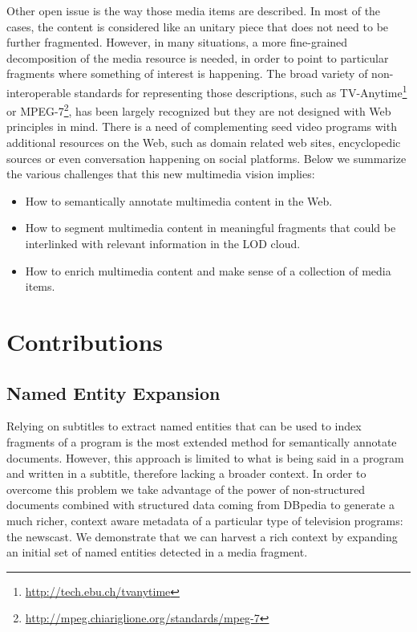\documentclass[a4paper,11pt]{report}
\begin{document}
Other open issue is the way those media items are described. In most of the cases, the content is considered like an unitary piece that does not need to be further fragmented. However, in many situations, a more fine-grained decomposition of the media resource is needed, in order to point to particular fragments where something of interest is happening. The broad variety of non-interoperable standards for representing those descriptions, such as TV-Anytime\footnote{\url{http://tech.ebu.ch/tvanytime}} or MPEG-7\footnote{\url{http://mpeg.chiariglione.org/standards/mpeg-7}}, has been largely recognized but they are not designed with Web principles in mind. There is a need of complementing seed video programs with additional resources on the Web, such as domain related web sites, encyclopedic sources or even conversation happening on social platforms. Below we summarize the various challenges that this new multimedia vision implies:
\begin{itemize}
\item How to semantically annotate multimedia content in the Web.
\item How to segment multimedia content in meaningful fragments that could be interlinked with relevant information in the LOD cloud.
\item How to enrich multimedia content and make sense of a collection of media items.
\end{itemize}


\chapter*{Contributions}
\section*{Named Entity Expansion} \label{expansion}

Relying on subtitles to extract named entities that can be used to index fragments of a program is the most extended method for semantically annotate documents. However, this approach is limited to what is being said in a program and written in a subtitle, therefore lacking a broader context. In order to overcome this problem we take advantage of the power of non-structured documents combined with structured data coming from DBpedia to generate a much richer, context aware metadata of a particular type of television programs: the newscast. We demonstrate that we can harvest a rich context by expanding an initial set of named entities detected in a media fragment.
\end{document}
